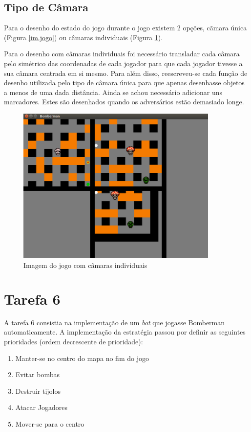 \documentclass[a4paper]{article}
\begin{document}
\subsection{Tipo de Câmara}
\label{camara}

Para o desenho do estado do jogo durante o jogo existem 2 opções, cãmara única (Figura \ref{im.jogo})
ou câmaras individuais (Figura \ref{cam.ind}).

Para o desenho com câmaras individuais foi necessário transladar cada câmara pelo simétrico
das coordenadas de cada jogador para que cada jogador tivesse a sua câmara centrada em
si mesmo. Para além disso, reescreveu-se cada função de desenho utilizada pelo tipo de câmara
única para que apenas desenhasse objetos a menos de uma dada distância.
Ainda se achou necessário adicionar uns marcadores. Estes são desenhados quando os
adversários estão demasiado longe.

\begin{figure}[h]
 \centering
 \includegraphics[width=10cm]{cam_ind}
 \caption{Imagem do jogo com câmaras individuais}
 \label{cam.ind}
\end{figure}

\section{Tarefa 6}
\label{tarefa6}

A tarefa 6 consistia na implementação de um \textit{bot} que jogasse Bomberman automaticamente.
A implementação da estratégia passou por definir as seguintes prioridades
(ordem decrescente de prioridade): 
\begin{enumerate}
  \item Manter-se no centro do mapa no fim do jogo
  \item Evitar bombas
  \item Destruir tijolos
  \item Atacar Jogadores
  \item Mover-se para o centro
\end{enumerate}
\end{document}
